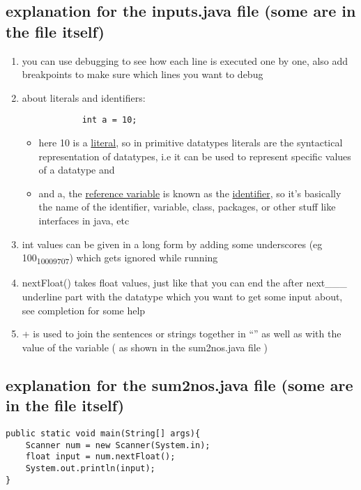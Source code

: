 \documentclass[11pt]{article}
\begin{document}
\subsection{explanation for the inputs.java file (some are in the file itself)}
\label{sec:org08d217a}
\begin{enumerate}
\item you can use debugging to see how each line is executed one by one, also add breakpoints to make sure which lines you want to debug
\item about literals and identifiers:
\begin{verbatim}
            int a = 10;
\end{verbatim}
\begin{itemize}
\item here 10 is a \uline{literal}, so in primitive datatypes literals are the syntactical representation of datatypes, i.e it can be used to represent specific values of a datatype and
\item and a, the \uline{reference variable} is known as the \uline{identifier}, so it's basically the name of the identifier, variable, class, packages, or other stuff like interfaces in java, etc
\end{itemize}
\item int values can be given in a long form by adding some underscores (eg 100\textsubscript{100}\textsubscript{09707}) which gets ignored while running
\item nextFloat() takes float values, just like that you can end the after next\_\_\_ underline part with the datatype which you want to get some input about, see completion for some help
\item + is used to join the sentences or strings together in ``'' as well as with the value of the variable ( as shown in the sum2nos.java file )
\end{enumerate}

\subsection{explanation for the sum2nos.java file (some are in the file itself)}
\label{sec:orgc3303cb}
\begin{verbatim}
public static void main(String[] args){
    Scanner num = new Scanner(System.in);
    float input = num.nextFloat();
    System.out.println(input);
}
\end{verbatim}
\end{document}

